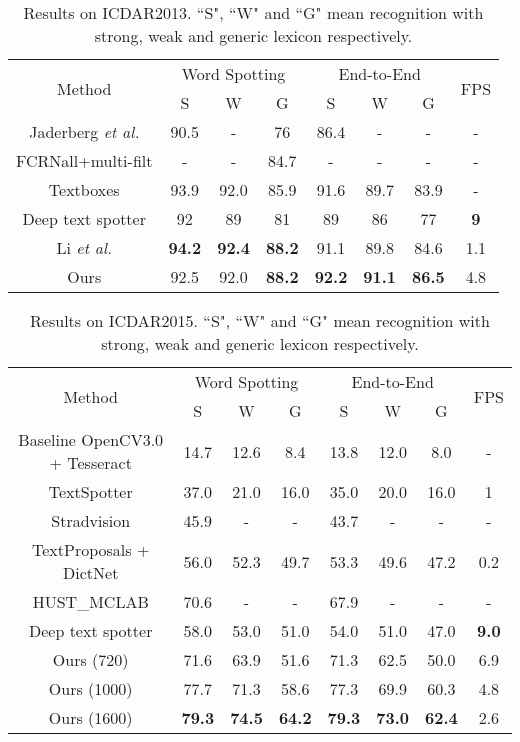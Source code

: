 \documentclass[runningheads]{llncs}
\begin{document}
\begin{table}[ht]
\begin{centering}
\caption{Results on ICDAR2013. ``S", ``W" and ``G" mean recognition with strong, weak and generic lexicon respectively.}
\label{tab_icdar2013}
\begin{tabular}{|c|c|c|c|c|c|c|c|}
\hline 
\multirow{2}{*}{Method} & \multicolumn{3}{c|}{Word Spotting} & \multicolumn{3}{c|}{End-to-End} & \multirow{2}{*}{FPS}\tabularnewline
\cline{2-7} 
 & S & W & G & S & W & G & \tabularnewline
\hline 
\hline
Jaderberg \emph{et al.} \cite{jaderberg2016reading} & 90.5  & - & 76 & 86.4 & - & - & - \tabularnewline
\hline 
 FCRNall+multi-filt \cite{SynthText} & - & - & 84.7 & - & - & - &  - \tabularnewline
 \hline 
Textboxes \cite{liao2017textboxes}  & 93.9  & 92.0  & 85.9 & 91.6 & 89.7 & 83.9 & - \tabularnewline
 \hline 
Deep text spotter \cite{Busta_2017_ICCV} & 92 & 89 & 81 & 89 & 86 & 77 & \textbf{9} \tabularnewline
\hline 
Li \emph{et al.} \cite{Li_2017_ICCV}  &\textbf{94.2} &\textbf{92.4} &\textbf{88.2} &91.1 &89.8 &84.6 & 1.1 \tabularnewline
\hline 
\hline
 Ours  &92.5 &92.0 &\textbf{88.2} &\textbf{92.2} &\textbf{91.1} &\textbf{86.5} &4.8   \tabularnewline
\hline
\end{tabular}
\par\end{centering}
\end{table}

\begin{table}[ht]
\begin{centering}
\caption{Results on ICDAR2015. ``S", ``W" and ``G" mean recognition with strong, weak and generic lexicon respectively.}
\label{tab_icdar2015}
\begin{tabular}{|c|c|c|c|c|c|c|c|}
\hline 
\multirow{2}{*}{Method} & \multicolumn{3}{c|}{Word Spotting} & \multicolumn{3}{c|}{End-to-End} & \multirow{2}{*}{FPS}\tabularnewline
\cline{2-7} 
 & S & W & G & S & W & G & \tabularnewline
\hline 
\hline
Baseline OpenCV3.0 + Tesseract\cite{karatzas2015icdar}  & 14.7 & 12.6 & 8.4 & 13.8  & 12.0  & 8.0 & - \tabularnewline
\hline 
TextSpotter \cite{neumann2016real} & 37.0  & 21.0 & 16.0 & 35.0 & 20.0 & 16.0 & 1 \tabularnewline
\hline 
Stradvision \cite{karatzas2015icdar} & 45.9  & - & - & 43.7 & - & - & - \tabularnewline
\hline 
TextProposals + DictNet \cite{gomez2017textproposals,Jaderberg14c} & 56.0 & 52.3 & 49.7 & 53.3 & 49.6 & 47.2 &  0.2 \tabularnewline
\hline 
HUST\_MCLAB \cite{shi2017detecting,shi2017end} & 70.6 & - & - & 67.9 & - & - &  - \tabularnewline
 \hline 
Deep text spotter \cite{Busta_2017_ICCV} & 58.0 & 53.0 & 51.0 & 54.0 & 51.0 & 47.0 & \textbf{9.0} \tabularnewline
\hline 
\hline
 Ours (720)  &71.6  &63.9  &51.6  &71.3  &62.5  &50.0  &6.9   \tabularnewline
\hline
 Ours (1000)  &77.7  &71.3  &58.6  &77.3  &69.9  &60.3  &4.8   \tabularnewline
\hline
 Ours (1600)  &\textbf{79.3}  &\textbf{74.5}  &\textbf{64.2}  &\textbf{79.3}  &\textbf{73.0}  &\textbf{62.4}  &2.6   \tabularnewline
\hline
\end{tabular}
\par\end{centering}
\end{table}
\end{document}
